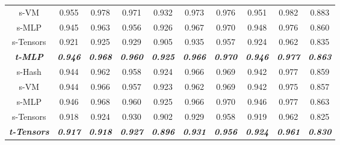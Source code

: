 \documentclass[letterpaper]{article} \usepackage{aaai23}  \usepackage{times}  \usepackage{helvet}  \usepackage{courier}  \usepackage[hyphens]{url}  \usepackage{graphicx} \urlstyle{rm} \def\UrlFont{\rm}  \usepackage{natbib}  \usepackage{caption} \frenchspacing  \setlength{\pdfpagewidth}{8.5in}  \setlength{\pdfpageheight}{11in}  \usepackage{multirow}
\begin{document}
\begin{table*}[t]
{\begin{tabular}{c|ccccccccc}
s-VM                        & 0.955                   & 0.978                   & 0.971                   & 0.932                   & 0.973                   & 0.976                   & 0.951                   & 0.982                   & 0.883                   \\
s-MLP                       & 0.945                   & 0.963                   & 0.956                   & 0.926                   & 0.967                   & 0.970                   & 0.948                   & 0.976                   & 0.860                   \\
s-Tensors                   & 0.921                   & 0.925                   & 0.929                   & 0.905                   & 0.935                   & 0.957                   & 0.924                   & 0.962                   & 0.835                   \\ \hline
\textit{\textbf{t-MLP}}     & \textit{\textbf{0.946}} & \textit{\textbf{0.968}} & \textit{\textbf{0.960}} & \textit{\textbf{0.925}} & \textit{\textbf{0.966}} & \textit{\textbf{0.970}} & \textit{\textbf{0.946}} & \textit{\textbf{0.977}} & \textit{\textbf{0.863}} \\ \hline
s-Hash                      & 0.944                   & 0.962                   & 0.958                   & 0.924                   & 0.966                   & 0.969                   & 0.942                   & 0.977                   & 0.859                   \\
s-VM                        & 0.944                   & 0.966                   & 0.957                   & 0.923                   & 0.962                   & 0.969                   & 0.942                   & 0.975                   & 0.857                   \\
s-MLP                       & 0.946                   & 0.968                   & 0.960                   & 0.925                   & 0.966                   & 0.970                   & 0.946                   & 0.977                   & 0.863                   \\
s-Tensors                   & 0.918                   & 0.924                   & 0.930                   & 0.902                   & 0.929                   & 0.958                   & 0.919                   & 0.962                   & 0.825                   \\ \hline
\textit{\textbf{t-Tensors}} & \textit{\textbf{0.917}} & \textit{\textbf{0.918}} & \textit{\textbf{0.927}} & \textit{\textbf{0.896}} & \textit{\textbf{0.931}} & \textit{\textbf{0.956}} & \textit{\textbf{0.924}} & \textit{\textbf{0.961}} & \textit{\textbf{0.830}} \\ \hline

\end{tabular}}
\end{table*}
\end{document}
